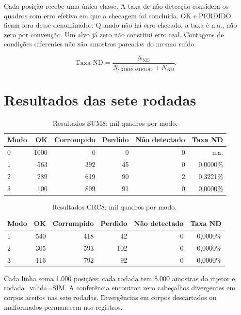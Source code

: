 \documentclass[12pt,a4paper]{article}
\begin{document}
Cada posição recebe uma única classe. A taxa de não detecção considera os quadros com erro efetivo em que a checagem foi concluída. OK e PERDIDO ficam fora desse denominador. Quando não há erro checado, a taxa é n.a., não zero por convenção. Um alvo já zero não constitui erro real. Contagens de condições diferentes não são amostras pareadas do mesmo ruído.\par

\begin{equation}\text{Taxa ND}=\frac{N_{\mathrm{ND}}}{N_{\mathrm{CORROMPIDO}}+N_{\mathrm{ND}}}.\end{equation}

\section{Resultados das sete rodadas}

\begin{table}[htbp]\centering\small\caption{Resultados SUM8: mil quadros por modo.}\label{tab:sum8}
\begin{tabular}{lrrrrr}\toprule
Modo & OK & Corrompido & Perdido & Não detectado & Taxa ND \\
\midrule
0 & 1000 & 0 & 0 & 0 & n.a. \\
1 & 563 & 392 & 45 & 0 & 0,0000\% \\
2 & 289 & 619 & 90 & 2 & 0,3221\% \\
3 & 100 & 809 & 91 & 0 & 0,0000\% \\
\bottomrule\end{tabular}\end{table}

\begin{table}[htbp]\centering\small\caption{Resultados CRC8: mil quadros por modo.}\label{tab:crc8}
\begin{tabular}{lrrrrr}\toprule
Modo & OK & Corrompido & Perdido & Não detectado & Taxa ND \\
\midrule
1 & 540 & 418 & 42 & 0 & 0,0000\% \\
2 & 305 & 593 & 102 & 0 & 0,0000\% \\
3 & 116 & 792 & 92 & 0 & 0,0000\% \\
\bottomrule\end{tabular}\end{table}

Cada linha soma 1.000 posições; cada rodada tem 8.000 amostras do injetor e rodada\_valida=SIM. A conferência encontrou zero cabeçalhos divergentes em corpos aceitos nas sete rodadas. Divergências em corpos descartados ou malformados permanecem nos registros.\par
\end{document}
